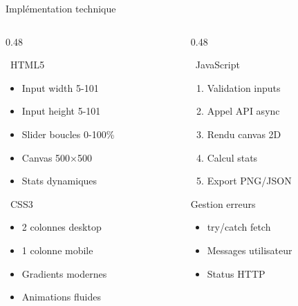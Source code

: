 \documentclass[aspectratio=169, 12pt]{beamer}
\begin{document}
\begin{frame}{Implémentation technique}
\begin{columns}[T]
\begin{column}{0.48\textwidth}
\begin{block}{\small \faFileAlt~HTML5}
\begin{itemize}
    \item Input width 5-101
    \item Input height 5-101
    \item Slider boucles 0-100\%
    \item Canvas 500×500
    \item Stats dynamiques
\end{itemize}
\end{block}

\begin{block}{\small \faPalette~CSS3}
\begin{itemize}
    \item 2 colonnes desktop
    \item 1 colonne mobile
    \item Gradients modernes
    \item Animations fluides
\end{itemize}
\end{block}
\end{column}

\begin{column}{0.48\textwidth}
\begin{block}{\small \faCode~JavaScript}
\begin{enumerate}
    \item Validation inputs
    \item Appel API async
    \item Rendu canvas 2D
    \item Calcul stats
    \item Export PNG/JSON
\end{enumerate}
\end{block}

\begin{block}{\small Gestion erreurs}
\begin{itemize}
    \item try/catch fetch
    \item Messages utilisateur
    \item Status HTTP
\end{itemize}
\end{block}
\end{column}
\end{columns}
\end{frame}
\end{document}
